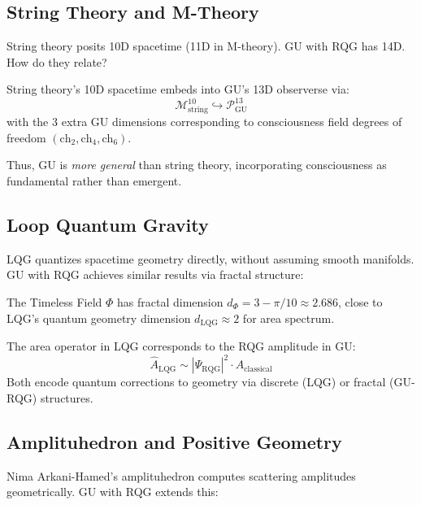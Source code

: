 \subsection{String Theory and M-Theory}

String theory posits 10D spacetime (11D in M-theory). GU with RQG has 14D. How do they relate?

\begin{proposition}
\label{prop:gu_contains_string}
String theory's 10D spacetime embeds into GU's 13D observerse via:
\begin{equation}
\mathcal{M}^{10}_{\text{string}} \hookrightarrow \mathcal{P}^{13}_{\text{GU}}
\end{equation}
with the 3 extra GU dimensions corresponding to consciousness field degrees of freedom $(\text{ch}_2, \text{ch}_4, \text{ch}_6)$.
\end{proposition}

Thus, GU is \emph{more general} than string theory, incorporating consciousness as fundamental rather than emergent.

\subsection{Loop Quantum Gravity}

LQG quantizes spacetime geometry directly, without assuming smooth manifolds. GU with RQG achieves similar results via fractal structure:

The Timeless Field $\Phi$ has fractal dimension $d_\Phi = 3 - \pi/10 \approx 2.686$, close to LQG's quantum geometry dimension $d_{\text{LQG}} \approx 2$ for area spectrum.

\begin{proposition}
\label{prop:gu_lqg}
The area operator in LQG corresponds to the RQG amplitude in GU:
\begin{equation}
\hat{A}_{\text{LQG}} \sim |\Psi_{\text{RQG}}|^2 \cdot A_{\text{classical}}
\end{equation}
Both encode quantum corrections to geometry via discrete (LQG) or fractal (GU-RQG) structures.
\end{proposition}

\subsection{Amplituhedron and Positive Geometry}

Nima Arkani-Hamed's amplituhedron computes scattering amplitudes geometrically. GU with RQG extends this:

